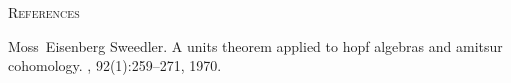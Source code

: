 \vspace{1em}

\begin{center}
	{\normalsize \textsc{References}}
\end{center}


\begin{thebibliography}{Swe70}

%

Moss~Eisenberg Sweedler.
\newblock A units theorem applied to hopf algebras and amitsur cohomology.
, 92(1):259--271, 1970.

\end{thebibliography}


\endgroup